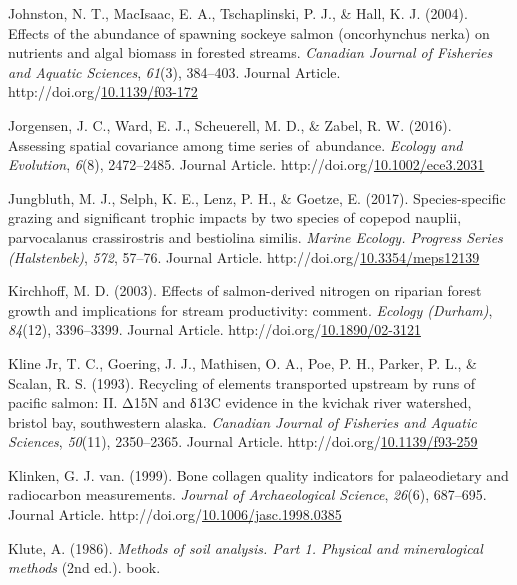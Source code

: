 \documentclass [11pt, proquest] {uwthesis}[2015/03/03]
\newlength{\cslhangindent}
\newenvironment{CSLReferences}%
{\setlength{\parindent}{0pt}%
\everypar{\setlength{\hangindent}{\cslhangindent}}\ignorespaces}%
{\par}
\begin{document}
\begin{CSLReferences}{1}{0}
\leavevmode\hypertarget{ref-Johnston2004}{}%
Johnston, N. T., MacIsaac, E. A., Tschaplinski, P. J., \& Hall, K. J. (2004). Effects of the abundance of spawning sockeye salmon (oncorhynchus nerka) on nutrients and algal biomass in forested streams. \emph{Canadian Journal of Fisheries and Aquatic Sciences}, \emph{61}(3), 384--403. Journal Article. http://doi.org/\href{https://doi.org/10.1139/f03-172}{10.1139/f03-172}

\leavevmode\hypertarget{ref-Jorgensen2016}{}%
Jorgensen, J. C., Ward, E. J., Scheuerell, M. D., \& Zabel, R. W. (2016). Assessing spatial covariance among time series of~abundance. \emph{Ecology and Evolution}, \emph{6}(8), 2472--2485. Journal Article. http://doi.org/\href{https://doi.org/10.1002/ece3.2031}{10.1002/ece3.2031}

\leavevmode\hypertarget{ref-Jungbluth2017}{}%
Jungbluth, M. J., Selph, K. E., Lenz, P. H., \& Goetze, E. (2017). Species-specific grazing and significant trophic impacts by two species of copepod nauplii, parvocalanus crassirostris and bestiolina similis. \emph{Marine Ecology. Progress Series (Halstenbek)}, \emph{572}, 57--76. Journal Article. http://doi.org/\href{https://doi.org/10.3354/meps12139}{10.3354/meps12139}

\leavevmode\hypertarget{ref-Kirchoff2003}{}%
Kirchhoff, M. D. (2003). Effects of salmon-derived nitrogen on riparian forest growth and implications for stream productivity: comment. \emph{Ecology (Durham)}, \emph{84}(12), 3396--3399. Journal Article. http://doi.org/\href{https://doi.org/10.1890/02-3121}{10.1890/02-3121}

\leavevmode\hypertarget{ref-Kline1993}{}%
Kline Jr, T. C., Goering, J. J., Mathisen, O. A., Poe, P. H., Parker, P. L., \& Scalan, R. S. (1993). Recycling of elements transported upstream by runs of pacific salmon: II. Δ15N and δ13C evidence in the kvichak river watershed, bristol bay, southwestern alaska. \emph{Canadian Journal of Fisheries and Aquatic Sciences}, \emph{50}(11), 2350--2365. Journal Article. http://doi.org/\href{https://doi.org/10.1139/f93-259}{10.1139/f93-259}

\leavevmode\hypertarget{ref-vanKlinken1999}{}%
Klinken, G. J. van. (1999). Bone collagen quality indicators for palaeodietary and radiocarbon measurements. \emph{Journal of Archaeological Science}, \emph{26}(6), 687--695. Journal Article. http://doi.org/\href{https://doi.org/10.1006/jasc.1998.0385}{10.1006/jasc.1998.0385}

\leavevmode\hypertarget{ref-Klute1986}{}%
Klute, A. (1986). \emph{Methods of soil analysis. Part 1. Physical and mineralogical methods} (2nd ed.). book.


\end{CSLReferences}
\end{document}
